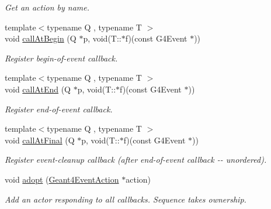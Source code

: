 \begin{DoxyCompactItemize}
\begin{DoxyCompactList}\small\item\em Get an action by name. \item\end{DoxyCompactList}\item 
{\footnotesize template$<$typename Q , typename T $>$ }\\void \hyperlink{class_d_d4hep_1_1_simulation_1_1_geant4_event_action_sequence_a83518f996c88a12e92e52446fc4a868b}{callAtBegin} (Q $\ast$p, void(T::$\ast$f)(const G4Event $\ast$))
\begin{DoxyCompactList}\small\item\em Register begin-\/of-\/event callback. \item\end{DoxyCompactList}\item 
{\footnotesize template$<$typename Q , typename T $>$ }\\void \hyperlink{class_d_d4hep_1_1_simulation_1_1_geant4_event_action_sequence_a8d53a540711a752831ac7ef62a42e3f3}{callAtEnd} (Q $\ast$p, void(T::$\ast$f)(const G4Event $\ast$))
\begin{DoxyCompactList}\small\item\em Register end-\/of-\/event callback. \item\end{DoxyCompactList}\item 
{\footnotesize template$<$typename Q , typename T $>$ }\\void \hyperlink{class_d_d4hep_1_1_simulation_1_1_geant4_event_action_sequence_ae7a55dcc337b690ff07f86614416a8d5}{callAtFinal} (Q $\ast$p, void(T::$\ast$f)(const G4Event $\ast$))
\begin{DoxyCompactList}\small\item\em Register event-\/cleanup callback (after end-\/of-\/event callback -\/-\/ unordered). \item\end{DoxyCompactList}\item 
void \hyperlink{class_d_d4hep_1_1_simulation_1_1_geant4_event_action_sequence_a21013600fd6c11994991e76878fb0896}{adopt} (\hyperlink{class_d_d4hep_1_1_simulation_1_1_geant4_event_action}{Geant4EventAction} $\ast$action)
\begin{DoxyCompactList}\small\item\em Add an actor responding to all callbacks. Sequence takes ownership. \item\end{DoxyCompactList}\item 

\end{DoxyCompactItemize}
